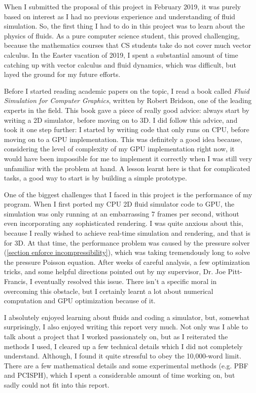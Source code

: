 When I submitted the proposal of this project in February 2019, it was purely based on interest as I had no previous experience and understanding of fluid simulation. So, the first thing I had to do in this project was to learn about the physics of fluids. As a pure computer science student, this proved challenging, because the mathematics courses that CS students take do not cover much vector calculus. In the Easter vacation of 2019, I spent a substantial amount of time catching up with vector calculus and fluid dynamics, which was difficult, but layed the ground for my future efforts.

Before I started reading academic papers on the topic, I read a book called \textit{Fluid Simulation for Computer Graphics}\cite{bridson2015fluid}, written by Robert Bridson, one of the leading experts in the field. This book gave a piece of really good advice: always start by writing a 2D simulator, before moving on to 3D. I did follow this advice, and took it one step further: I started by writing code that only runs on CPU, before moving on to a GPU implementation. This was definitely a good idea because, considering the level of complexity of my GPU implementation right now, it would have been impossible for me to implement it correctly when I was still very unfamiliar with the problem at hand. A lesson learnt here is that for complicated tasks, a good way to start is by building a simple prototype.

One of the biggest challenges that I faced in this project is the performance of my program. When I first ported my CPU 2D fluid simulator code to GPU, the simulation was only running at an embarrassing 7 frames per second, without even incorporating any sophisticated rendering. I was quite anxious about this, because I really wished to achieve real-time simulation and rendering, and that is for 3D. At that time, the performance problem was caused by the pressure solver (\ref{section enforce incompressibility}), which was taking tremendously long to solve the pressure Poisson equation. After weeks of careful analysis, a few optimization tricks, and some helpful directions pointed out by my supervisor, Dr. Joe Pitt-Francis, I eventually resolved this issue. There isn't a specific moral in overcoming this obstacle, but I certainly learnt a lot about numerical computation and GPU optimization because of it.

I absolutely enjoyed learning about fluids and coding a simulator, but, somewhat surprisingly, I also enjoyed writing this report very much. Not only was I able to talk about a project that I worked passionately on, but as I reiterated the methods I used, I cleared up a few technical details which I did not completely understand. Although, I found it quite stressful to obey the 10,000-word limit. There are a few mathematical details and some experimental methods (e.g. PBF and PCISPH), which I spent a considerable amount of time working on, but sadly could not fit into this report.

